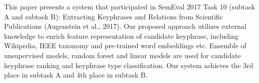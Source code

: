 This paper presents a system that participated in SemEval 2017 Task 10 (subtask A and subtask B): Extracting Keyphrases and Relations from Scientific Publications (Augenstein et al., 2017). Our proposed approach utilizes external knowledge to enrich feature representation of candidate keyphrase, including Wikipedia, IEEE taxonomy and pre-trained word embeddings etc. Ensemble of unsupervised models, random forest and linear models are used for candidate keyphrase ranking and keyphrase type classification. Our system achieves the 3rd place in subtask A and 4th place in subtask B.
